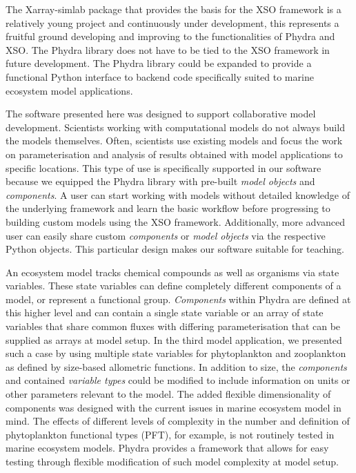 \documentclass[journal abbreviation, manuscript]{copernicus}
\begin{document}
The Xarray-simlab package that provides the basis for the XSO framework is a relatively young project and continuously under development, this represents a fruitful ground developing and improving to the functionalities of Phydra and XSO. The Phydra library does not have to be tied to the XSO framework in future development. The Phydra library could be expanded to provide a functional Python interface to backend code specifically suited to marine ecosystem model applications.

The software presented here was designed to support collaborative model development. Scientists working with computational models do not always build the models themselves. Often, scientists use existing models and focus the work on parameterisation and analysis of results obtained with model applications to specific locations. This type of use is specifically supported in our software because we equipped the Phydra library with pre-built \textit{model objects} and \textit{components}. A user can start working with models without detailed knowledge of the underlying framework and learn the basic workflow before progressing to building custom models using the XSO framework. Additionally, more advanced user can easily share custom \textit{components} or \textit{model objects} via the respective Python objects. This particular design makes our software suitable for teaching.

An ecosystem model tracks chemical compounds as well as organisms via state variables. These state variables can define completely different components of a model, or represent a functional group. \textit{Components} within Phydra are defined at this higher level and can contain a single state variable or an array of state variables that share common fluxes with differing parameterisation that can be supplied as arrays at model setup. In the third model application, we presented such a case by using multiple state variables for phytoplankton and zooplankton as defined by size-based allometric functions. In addition to size, the \textit{components} and contained \textit{variable types} could be modified to include information on units or other parameters relevant to the model. The added flexible dimensionality of components was designed with the current issues in marine ecosystem model in mind. The effects of different levels of complexity in the number and definition of phytoplankton functional types (PFT), for example, is not routinely tested in marine ecosystem models. Phydra provides a framework that allows for easy testing through flexible modification of such model complexity at model setup.
\end{document}
